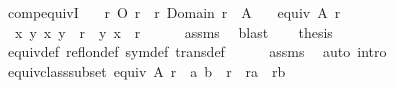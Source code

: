\begin{isabellebody}
\ comp{\isacharunderscore}{\kern0pt}equivI{\isacharcolon}{\kern0pt}\isanewline
\ \ \ {\isachardoublequoteopen}r{\isasyminverse}\ O\ r\ {\isacharequal}{\kern0pt}\ r{\isachardoublequoteclose}\ {\isachardoublequoteopen}Domain\ r\ {\isacharequal}{\kern0pt}\ A{\isachardoublequoteclose}\isanewline
\ \ \ {\isachardoublequoteopen}equiv\ A\ r{\isachardoublequoteclose}\isanewline
%
\isadelimproof
%
\endisadelimproof
%
\isatagproof
{}\isamarkupfalse%
\ {\isacharminus}{\kern0pt}\isanewline
\ \ \isamarkupfalse%
\ {\isacharasterisk}{\kern0pt}{\isacharcolon}{\kern0pt}\ {\isachardoublequoteopen}{\isasymAnd}x\ y{\isachardot}{\kern0pt}\ {\isacharparenleft}{\kern0pt}x{\isacharcomma}{\kern0pt}\ y{\isacharparenright}{\kern0pt}\ {\isasymin}\ r\ {\isasymLongrightarrow}\ {\isacharparenleft}{\kern0pt}y{\isacharcomma}{\kern0pt}\ x{\isacharparenright}{\kern0pt}\ {\isasymin}\ r{\isachardoublequoteclose}\isanewline
\ \ \ \ \isamarkupfalse%
\ assms\ \isamarkupfalse%
\ blast\isanewline
\ \ \isamarkupfalse%
\ {\isacharquery}{\kern0pt}thesis\isanewline
\ \ \ \ \isamarkupfalse%
\ equiv{\isacharunderscore}{\kern0pt}def\ refl{\isacharunderscore}{\kern0pt}on{\isacharunderscore}{\kern0pt}def\ sym{\isacharunderscore}{\kern0pt}def\ trans{\isacharunderscore}{\kern0pt}def\isanewline
\ \ \ \ \isamarkupfalse%
\ assms\ \isamarkupfalse%
\ {\isacharparenleft}{\kern0pt}auto\ intro{\isacharcolon}{\kern0pt}\ {\isacharasterisk}{\kern0pt}{\isacharparenright}{\kern0pt}\isanewline
{}\isamarkupfalse%
%
\endisatagproof
{\isafoldproof}%
%
\isadelimproof
%
\endisadelimproof
%
\isadelimdocument
%
\endisadelimdocument
%
\isatagdocument
%
\isamarkuptrue%
%
\endisatagdocument
{\isafolddocument}%
%
\isadelimdocument
%
\endisadelimdocument
{}\isamarkupfalse%
\ equiv{\isacharunderscore}{\kern0pt}class{\isacharunderscore}{\kern0pt}subset{\isacharcolon}{\kern0pt}\ {\isachardoublequoteopen}equiv\ A\ r\ {\isasymLongrightarrow}\ {\isacharparenleft}{\kern0pt}a{\isacharcomma}{\kern0pt}\ b{\isacharparenright}{\kern0pt}\ {\isasymin}\ r\ {\isasymLongrightarrow}\ r{\isacharbackquote}{\kern0pt}{\isacharbackquote}{\kern0pt}{\isacharbraceleft}{\kern0pt}a{\isacharbraceright}{\kern0pt}\ {\isasymsubseteq}\ r{\isacharbackquote}{\kern0pt}{\isacharbackquote}{\kern0pt}{\isacharbraceleft}{\kern0pt}b{\isacharbraceright}{\kern0pt}{\isachardoublequoteclose}\isanewline
\ \ %
\end{isabellebody}

